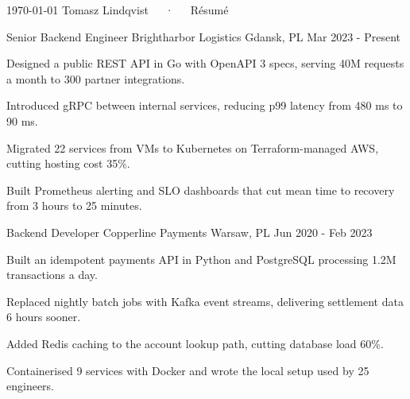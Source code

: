 \documentclass[11pt, a4paper]{awesome-cv}
\begin{document}
\makecvheader[C]

\makecvfooter
  {\today}
  {Tomasz Lindqvist~~~·~~~Résumé}
  {\thepage}


\begin{cventries}

  \cventry
    {Senior Backend Engineer} %
    {Brightharbor Logistics} %
    {Gdansk, PL} %
    {Mar 2023 - Present} %
    {
      \begin{cvitems} %
        \item {Designed a public REST API in Go with OpenAPI 3 specs, serving 40M requests a month to 300 partner integrations.} %
        \item {Introduced gRPC between internal services, reducing p99 latency from 480 ms to 90 ms.} %
        \item {Migrated 22 services from VMs to Kubernetes on Terraform-managed AWS, cutting hosting cost 35\%.} %
        \item {Built Prometheus alerting and SLO dashboards that cut mean time to recovery from 3 hours to 25 minutes.} %
      \end{cvitems}
    }

  \cventry
    {Backend Developer} %
    {Copperline Payments} %
    {Warsaw, PL} %
    {Jun 2020 - Feb 2023} %
    {
      \begin{cvitems} %
        \item {Built an idempotent payments API in Python and PostgreSQL processing 1.2M transactions a day.} %
        \item {Replaced nightly batch jobs with Kafka event streams, delivering settlement data 6 hours sooner.} %
        \item {Added Redis caching to the account lookup path, cutting database load 60\%.} %
        \item {Containerised 9 services with Docker and wrote the local setup used by 25 engineers.} %
      \end{cvitems}
    }


\end{cventries}
\end{document}
